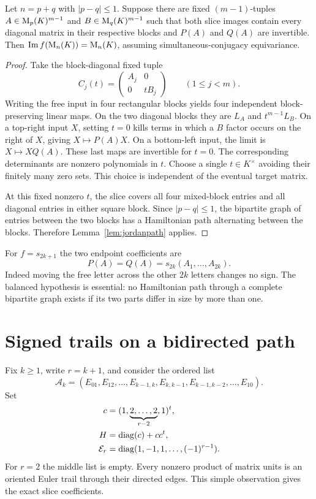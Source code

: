 \begin{theorem}\label{thm:transfer}
Let $n=p+q$ with $|p-q|\le1$. Suppose there are fixed
$(m-1)$-tuples $A\in\mathrm{M}_p(K)^{m-1}$ and
$B\in\mathrm{M}_q(K)^{m-1}$ such that both slice images contain every
diagonal matrix in their respective blocks and $P(A)$ and $Q(A)$
are invertible. Then $\operatorname{Im} f(\mathrm{M}_n(K))=\mathrm{M}_n(K)$, assuming
simultaneous-conjugacy equivariance.
\end{theorem}
\begin{proof}
Take the block-diagonal fixed tuple
\[
 C_j(t)=\begin{pmatrix}A_j&0\\0&tB_j\end{pmatrix}
 \qquad(1\le j<m).
\]
Writing the free input in four rectangular blocks yields four
independent block-preserving linear maps. On the two diagonal blocks
they are $L_A$ and $t^{m-1}L_B$. On a top-right input $X$,
setting $t=0$ kills terms in which a $B$ factor occurs on the
right of $X$, giving $X\mapsto P(A)X$. On a bottom-left input, the
limit is $X\mapsto XQ(A)$. These last maps are invertible for $t=0$.
The corresponding determinants are nonzero polynomials in $t$.
Choose a single $t\in K^\times$ avoiding their finitely many zero
sets. This choice is independent of the eventual target matrix.

At this fixed nonzero $t$, the slice covers all four mixed-block
entries and all diagonal entries in either square block. Since
$|p-q|\le1$, the bipartite graph of entries between the two blocks
has a Hamiltonian path alternating between the blocks. Therefore
Lemma~\ref{lem:jordanpath} applies.
\end{proof}

For $f=s_{2k+1}$ the two endpoint coefficients are
\begin{equation}\label{eq:endpoints}
 P(A)=Q(A)=s_{2k}(A_1,\ldots,A_{2k}).
\end{equation}
Indeed moving the free letter across the other $2k$ letters changes
no sign. The balanced hypothesis is essential: no Hamiltonian path
through a complete bipartite graph exists if its two parts differ in
size by more than one.

\section{Signed trails on a bidirected path}\label{sec:path}
Fix $k\ge1$, write $r=k+1$, and consider the ordered list
\begin{equation}\label{eq:pathlist}
 \mathcal A_k=(E_{01},E_{12},\ldots,E_{k-1,k},
 E_{k,k-1},E_{k-1,k-2},\ldots,E_{10}).
\end{equation}
Set
\[
\begin{aligned}
 c&=(1,\underbrace{2,\ldots,2}_{r-2},1)^t,\\
 H&=\operatorname{diag}(c)+cc^t,\\
 \mathcal E_r&=\operatorname{diag}(1,-1,1,\ldots,(-1)^{r-1}).
\end{aligned}
\]
For $r=2$ the middle list is empty. Every nonzero product of
matrix units is an oriented Euler trail through their directed
edges. This simple observation gives the exact slice coefficients.

